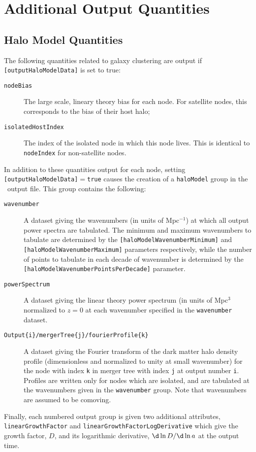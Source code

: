 \chapter{Additional Output Quantities}

\section{Halo Model Quantities}\label{sec:HaloModelOutput}

The following quantities related to galaxy clustering are output if {\tt [outputHaloModelData]} is set to true:
\begin{description}
 \item [{\tt nodeBias}] The large scale, lineary theory bias for each node. For satellite nodes, this corresponds to the bias of their host halo;
 \item [{\tt isolatedHostIndex}] The index of the isolated node in which this node lives. This is identical to {\tt nodeIndex} for non-satellite nodes.
\end{description}
In addition to these quantities output for each node, setting {\tt [outputHaloModelData]}$=${\tt true} causes the creation of a {\tt haloModel} group in the \glc\ output file. This group contains the following:
\begin{description}
 \item [{\tt wavenumber}] A dataset giving the wavenumbers (in units of Mpc$^{-1}$) at which all output power spectra are tabulated. The minimum and maximum wavenumbers to tabulate are determined by the {\tt [haloModelWavenumberMinimum]} and {\tt [haloModelWavenumberMaximum]} parameters respectively, while the number of points to tabulate in each decade of wavenumber is determined by the {\tt [haloModelWavenumberPointsPerDecade]} parameter.
 \item [{\tt powerSpectrum}] A dataset giving the linear theory power spectrum (in units of Mpc$^3$ normalized to $z=0$ at each wavenumber specified in the {\tt wavenumber} dataset.
 \item [{\tt Output\{i\}/mergerTree\{j\}/fourierProfile\{k\}}] A dataset giving the Fourier transform of the dark matter halo density profile (dimensionless and normalized to unity at small wavenumber) for the node with index {\tt k} in merger tree with index {\tt j} at output number {\tt i}. Profiles are written only for nodes which are isolated, and are tabulated at the wavenumbers given in the {\tt wavenumber} group. Note that wavenumbers are assumed to be comoving.
\end{description}
Finally, each numbered output group is given two additional attributes, {\tt linearGrowthFactor} and {\tt linearGrowthFactorLogDerivative} which give the growth factor, $D$, and its logarithmic derivative, $\d \ln D / \d \ln a$ at the output time.

